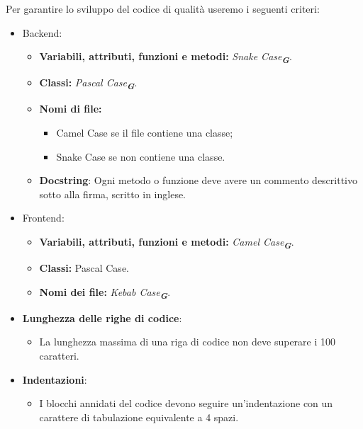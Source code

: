 \begin{enumerate}
Per garantire lo sviluppo del codice di qualità useremo i seguenti criteri:

\begin{itemize}
    \item Backend:
    \begin{itemize}
        \item \textbf{Variabili, attributi, funzioni e metodi:} \emph{Snake Case}\textsubscript{\textit{\textbf{G}}}.
        \item \textbf{Classi:} \emph{Pascal Case}\textsubscript{\textit{\textbf{G}}}.
        \item \textbf{Nomi di file:}
        \begin{itemize}
            \item Camel Case se il file contiene una classe;
            \item Snake Case se non contiene una classe.
        \end{itemize}
        \item \textbf{Docstring}: Ogni metodo o funzione deve avere un commento descrittivo sotto alla firma, scritto in inglese.
    \end{itemize}
    
    \item Frontend:
    \begin{itemize}
        \item \textbf{Variabili, attributi, funzioni e metodi:} \emph{Camel Case}\textsubscript{\textit{\textbf{G}}}.
        \item \textbf{Classi:} Pascal Case.
        \item \textbf{Nomi dei file:} \emph{Kebab Case}\textsubscript{\textit{\textbf{G}}}.
    \end{itemize}
    
    \item \textbf{Lunghezza delle righe di codice}:
    \begin{itemize}
        \item La lunghezza massima di una riga di codice non deve superare i 100 caratteri.
    \end{itemize}
    
    \item \textbf{Indentazioni}:
    \begin{itemize}
        \item I blocchi annidati del codice devono seguire un'indentazione con un carattere di tabulazione equivalente a 4 spazi.
    \end{itemize}
\end{itemize}


\end{enumerate}
